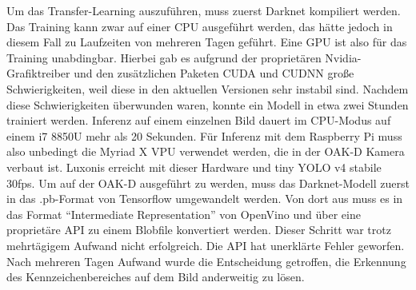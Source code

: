 Um das Transfer-Learning auszuführen, muss zuerst Darknet kompiliert werden. Das Training kann zwar auf einer CPU ausgeführt werden, das hätte jedoch in diesem Fall zu Laufzeiten von mehreren Tagen geführt. Eine GPU ist also für das Training unabdingbar.
Hierbei gab es aufgrund der proprietären Nvidia-Grafiktreiber und den zusätzlichen Paketen CUDA und CUDNN große Schwierigkeiten, weil diese in den aktuellen Versionen sehr instabil sind.
Nachdem diese Schwierigkeiten überwunden waren, konnte ein Modell in etwa zwei Stunden trainiert werden. Inferenz auf einem einzelnen Bild dauert im CPU-Modus auf einem i7 8850U mehr als 20 Sekunden. Für Inferenz mit dem Raspberry Pi muss also unbedingt die Myriad X VPU verwendet werden, die in der OAK-D Kamera verbaut ist. Luxonis erreicht mit dieser Hardware und tiny YOLO v4 stabile 30fps. \autocite[Vgl.][]{Luxonis1}
Um auf der OAK-D ausgeführt zu werden, muss das Darknet-Modell zuerst in das .pb-Format von Tensorflow umgewandelt werden.
Von dort aus muss es in das Format \enquote{Intermediate Representation} von OpenVino und über eine proprietäre API zu einem Blobfile konvertiert werden.
Dieser Schritt war trotz mehrtägigem Aufwand nicht erfolgreich. Die API hat unerklärte Fehler geworfen. Nach mehreren Tagen Aufwand wurde die Entscheidung getroffen, die Erkennung des Kennzeichenbereiches auf dem Bild anderweitig zu lösen.


